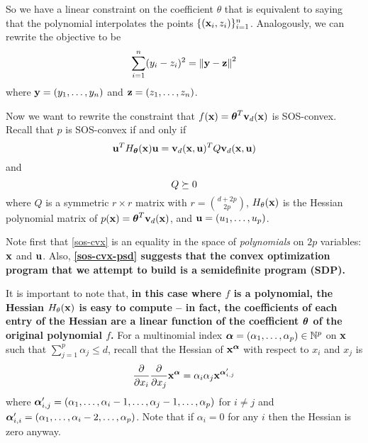\documentclass[11pt]{article}
\begin{document}
So we have a linear constraint on the coefficient $\theta$ that is equivalent to saying that the polynomial interpolates the points $\{({\bf x}_i, z_i)\}_{i=1}^n$. Analogously, we can rewrite the objective to be
\begin{equation}\label{sos-reg-obj2}
\sum_{i=1}^n(y_i - z_i)^2 = \left\lVert {\bf y} - {\bf z} \right\rVert^2
\end{equation}
where ${\bf y} = (y_1, \dotsc, y_n)$ and ${\bf z} = (z_1, \dotsc, z_n)$.


Now we want to rewrite the constraint that $f({\bf x}) = {\boldsymbol\theta}^T{\bf v}_d({\bf x})$ is SOS-convex. Recall that $p$ is SOS-convex if and only if
\begin{equation}\label{sos-cvx}
{\bf u}^TH_{\boldsymbol\theta}({\bf x}){\bf u} = {\bf v}_d({\bf x},{\bf u})^TQ{\bf v}_d({\bf x},{\bf u})
\end{equation}
and
\begin{equation}\label{sos-cvx-psd}
Q \succeq 0
\end{equation}
where $Q$ is a symmetric $r \times r$ matrix with $r = {d + 2p \choose 2p}$, $H_\theta({\bf x})$ is the Hessian polynomial matrix of $p({\bf x}) = {\boldsymbol\theta}^T{\bf v}_d({\bf x})$, and ${\bf u} = (u_1, \dotsc, u_p)$. 

Note first that \eqref{sos-cvx} is an equality in the space of \emph{polynomials} on $2p$ variables: ${\bf x}$ and ${\bf u}$. Also, \textbf{\eqref{sos-cvx-psd} suggests that the convex optimization program that we attempt to build is a semidefinite program (SDP).}

It is important to note that, \textbf{in this case where $f$ is a polynomial, the Hessian $H_\theta({\bf x})$ is easy to compute -- in fact, the coefficients of each entry of the Hessian are a linear function of the coefficient ${\boldsymbol\theta}$ of the original polynomial $f$.} For a multinomial index ${\boldsymbol\alpha} = (\alpha_1, \dotsc, \alpha_p) \in {\mathbb{N}}^p$ on ${\bf x}$ such that $\sum_{j=1}^p \alpha_j \leq d$, recall that the Hessian of ${\bf x}^{\boldsymbol\alpha}$ with respect to $x_i$ and $x_j$ is
\[
\frac{\partial}{\partial x_i}\frac{\partial}{\partial x_j} {\bf x}^{\boldsymbol\alpha} = \alpha_i\alpha_j {\bf x}^{{\boldsymbol\alpha}_{i,j}'}
\]
where ${\boldsymbol\alpha}_{i,j}' = (\alpha_1, \dotsc, \alpha_i-1, \dotsc, \alpha_j-1, \dotsc, \alpha_p)$ for $i \neq j$ and ${\boldsymbol\alpha}_{i,i}' = (\alpha_1, \dotsc, \alpha_i-2, \dotsc, \alpha_p)$. Note that if $\alpha_i = 0$ for any $i$ then the Hessian is zero anyway.
\end{document}
